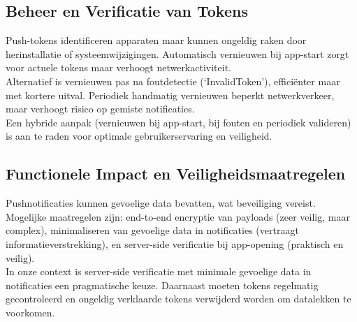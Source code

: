 \subsection{Beheer en Verificatie van Tokens}
Push-tokens identificeren apparaten maar kunnen ongeldig raken door herinstallatie of systeemwijzigingen. Automatisch vernieuwen bij app-start zorgt voor actuele tokens maar verhoogt netwerkactiviteit.\\

Alternatief is vernieuwen pas na foutdetectie (‘InvalidToken’), efficiënter maar met kortere uitval. Periodiek handmatig vernieuwen beperkt netwerkverkeer, maar verhoogt risico op gemiste notificaties.\\

Een hybride aanpak (vernieuwen bij app-start, bij fouten en periodiek valideren) is aan te raden voor optimale gebruikerservaring en veiligheid.

\subsection{Functionele Impact en Veiligheidsmaatregelen}
Pushnotificaties kunnen gevoelige data bevatten, wat beveiliging vereist. Mogelijke maatregelen zijn: end-to-end encryptie van payloads (zeer veilig, maar complex), minimaliseren van gevoelige data in notificaties (vertraagt informatieverstrekking), en server-side verificatie bij app-opening (praktisch en veilig).\\

In onze context is server-side verificatie met minimale gevoelige data in notificaties een pragmatische keuze. Daarnaast moeten tokens regelmatig gecontroleerd en ongeldig verklaarde tokens verwijderd worden om datalekken te voorkomen.


